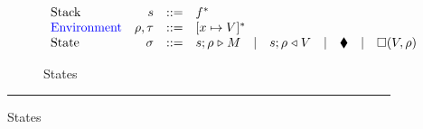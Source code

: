 \begin{figure}[!ht]
\caption{The CEK Machine}\label{fig:cek-machine}

\begin{subfigure}[c]{\linewidth}        %
{\small
\caption{States}
\[
\begin{array}{lrcl}
        \textrm{Stack} & s      & ::= & f^*    \\
 \textcolor{blue}{       \textrm{Environment}} & \rho, \tau & ::= & [x \mapsto V]^* \\
        \textrm{State} & \sigma & ::= & s;\rho \mathrel\triangleright M \quad | \quad s;\rho \mathrel\triangleleft V  \quad | \quad \blacklozenge{} \quad | \quad \square (V,\rho)
    \end{array}
\]
}
\end{subfigure}

\vspace{1mm}
\hrule
\vspace{2mm}


\end{figure}
